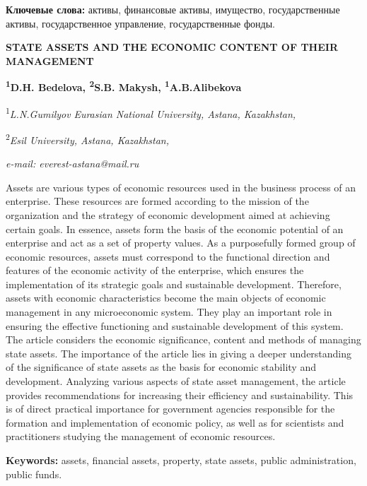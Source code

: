 {\bfseries Ключевые слова:} активы, финансовые активы, имущество,
государственные активы, государственное управление, государственные
фонды.

\begin{articleheader}
{\bfseries STATE ASSETS AND THE ECONOMIC CONTENT OF THEIR MANAGEMENT}

{\bfseries
\textsuperscript{1}D.H. Bedelova\textsuperscript{\envelope },
\textsuperscript{2}S.B. Makysh,
\textsuperscript{1}A.B.Alibekova}
\end{articleheader}

\begin{affiliation}
\textsuperscript{1}\emph{L.N.Gumilyov} \emph{Eurasian National University, Astana, Kazakhstan,}

\textsuperscript{2}\emph{Esil University, Astana, Kazakhstan,}

\emph{e-mail: everest-astana@mail.ru}
\end{affiliation}

Assets are various types of economic resources used in the business
process of an enterprise. These resources are formed according to the
mission of the organization and the strategy of economic development
aimed at achieving certain goals. In essence, assets form the basis of
the economic potential of an enterprise and act as a set of property
values. As a purposefully formed group of economic resources, assets
must correspond to the functional direction and features of the economic
activity of the enterprise, which ensures the implementation of its
strategic goals and sustainable development. Therefore, assets with
economic characteristics become the main objects of economic management
in any microeconomic system. They play an important role in ensuring the
effective functioning and sustainable development of this system. The
article considers the economic significance, content and methods of
managing state assets. The importance of the article lies in giving a
deeper understanding of the significance of state assets as the basis
for economic stability and development. Analyzing various aspects of
state asset management, the article provides recommendations for
increasing their efficiency and sustainability. This is of direct
practical importance for government agencies responsible for the
formation and implementation of economic policy, as well as for
scientists and practitioners studying the management of economic
resources.

{\bfseries Keywords:} assets, financial assets, property, state assets,
public administration, public funds.

